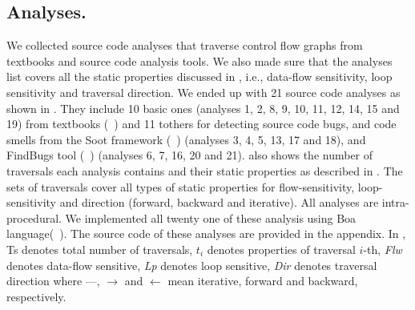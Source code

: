\subsection{Analyses.} We collected source code analyses that traverse control flow 
graphs from textbooks and source code analysis tools. We also made sure that the 
analyses list covers all the static properties discussed in  
, i.e., data-flow sensitivity, loop sensitivity and 
traversal direction. We ended up with 21 source code analyses as shown in 
. They include 10 basic ones (analyses 1, 2, 8, 9, 
10, 11, 12, 14, 15 and 19) from textbooks (~\cite{compilers, programanalysis}) and 11 
tothers for detecting source code bugs, and code smells from the Soot 
framework (~\cite{vallee1999soot}) (analyses 3, 4, 5, 13, 17 and 18), and 
FindBugs tool (~\cite{findbugs-paste2007}) (analyses 6, 7, 16, 20 and 21). 
 also shows the number of traversals each analysis 
contains and their static properties as described in . 
The sets of traversals cover all types of static properties for 
flow-sensitivity, loop-sensitivity and direction (forward, backward and iterative).
All analyses are intra-procedural. We implemented all twenty one of these analysis using Boa language(~\cite{dyer2013boa}). The source code of these analyses are provided in the appendix. In , Ts denotes total number of traversals, $t_i$ denotes properties of traversal $i$-th, \emph{Flw} denotes data-flow sensitive, \emph{Lp} denotes loop sensitive,
\emph{Dir} denotes traversal direction where ---, $\rightarrow$ and $\leftarrow$ 
mean iterative, forward and backward, respectively.





